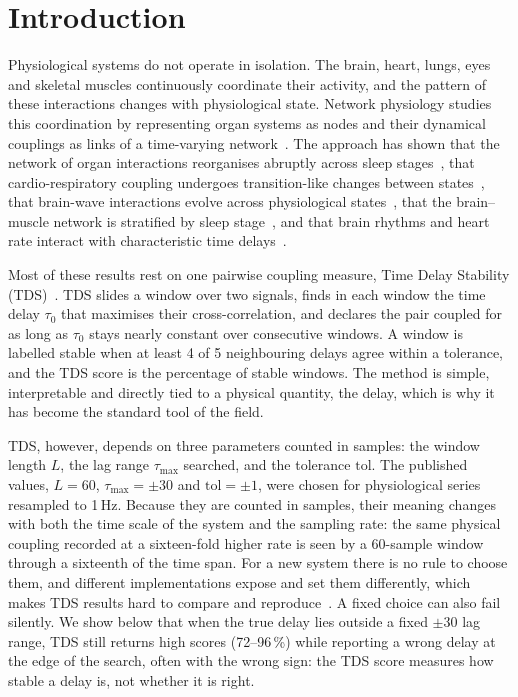 \documentclass[11pt,a4paper]{article}
\begin{document}
\section{Introduction}
\label{sec:intro}
Physiological systems do not operate in isolation. The brain, heart, lungs, eyes and skeletal muscles continuously coordinate their activity, and the pattern of these interactions changes with physiological state. Network physiology studies this coordination by representing organ systems as nodes and their dynamical couplings as links of a time-varying network~\cite{Bashan2012NetworkPhysiology,Bartsch2015NetworkPhysiology,Ivanov2021NewField}. The approach has shown that the network of organ interactions reorganises abruptly across sleep stages~\cite{Bashan2012NetworkPhysiology,Bartsch2015NetworkPhysiology}, that cardio-respiratory coupling undergoes transition-like changes between states~\cite{Bartsch2012PhaseTransitions}, that brain-wave interactions evolve across physiological states~\cite{Liu2015PlasticityBrain,Liu2015MajorComponent}, that the brain--muscle network is stratified by sleep stage~\cite{Rizzo2020NetworkPhysiology,Rizzo2022DynamicNetworks}, and that brain rhythms and heart rate interact with characteristic time delays~\cite{Lin2016DelaycorrelationLandscape}.

Most of these results rest on one pairwise coupling measure, Time Delay Stability (TDS)~\cite{Bashan2012NetworkPhysiology,Bartsch2015NetworkPhysiology}. TDS slides a window over two signals, finds in each window the time delay $\tau_0$ that maximises their cross-correlation, and declares the pair coupled for as long as $\tau_0$ stays nearly constant over consecutive windows. A window is labelled stable when at least 4 of 5 neighbouring delays agree within a tolerance, and the TDS score is the percentage of stable windows. The method is simple, interpretable and directly tied to a physical quantity, the delay, which is why it has become the standard tool of the field.

TDS, however, depends on three parameters counted in samples: the window length $L$, the lag range $\tau_{\max}$ searched, and the tolerance $\mathrm{tol}$. The published values, $L = 60$, $\tau_{\max} = \pm 30$ and $\mathrm{tol} = \pm 1$, were chosen for physiological series resampled to 1\,Hz. Because they are counted in samples, their meaning changes with both the time scale of the system and the sampling rate: the same physical coupling recorded at a sixteen-fold higher rate is seen by a 60-sample window through a sixteenth of the time span. For a new system there is no rule to choose them, and different implementations expose and set them differently, which makes TDS results hard to compare and reproduce~\cite{Steinbrinker2024TdspyOpensource}. A fixed choice can also fail silently. We show below that when the true delay lies outside a fixed $\pm30$ lag range, TDS still returns high scores (72--96\,\%) while reporting a wrong delay at the edge of the search, often with the wrong sign: the TDS score measures how stable a delay is, not whether it is right.
\end{document}

